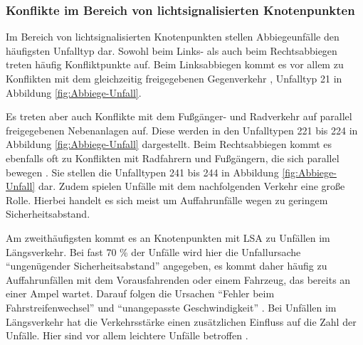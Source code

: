 \subsubsection{Konflikte im Bereich von lichtsignalisierten Knotenpunkten}\label{chapter:Knotenpunkte mit LSA}

Im Bereich von lichtsignalisierten Knotenpunkten stellen Abbiegeunfälle den häufigsten Unfalltyp dar. Sowohl beim Links- als auch beim Rechtsabbiegen treten häufig Konfliktpunkte auf. Beim Linksabbiegen kommt es vor allem zu Konflikten mit dem gleichzeitig freigegebenen Gegenverkehr \parencite[S. 273]{Schreiber.2016}, Unfalltyp 21 in Abbildung \ref{fig:Abbiege-Unfall}.

Es treten aber auch Konflikte mit dem Fußgänger- und Radverkehr auf parallel freigegebenen Nebenanlagen auf. Diese werden in den Unfalltypen 221 bis 224 in Abbildung \ref{fig:Abbiege-Unfall} dargestellt. Beim Rechtsabbiegen kommt es ebenfalls oft zu Konflikten mit Radfahrern und Fußgängern, die sich parallel bewegen \parencite[S. 273]{Schreiber.2016}. Sie stellen die Unfalltypen 241 bis 244 in Abbildung \ref{fig:Abbiege-Unfall} dar. Zudem spielen Unfälle mit dem nachfolgenden Verkehr eine große Rolle. Hierbei handelt es sich meist um Auffahrunfälle wegen zu geringem Sicherheitsabstand.

Am zweithäufigsten kommt es an Knotenpunkten mit \ac{LSA} zu Unfällen im Längsverkehr. Bei fast 70 \% der Unfälle wird hier die Unfallursache \enquote{ungenügender Sicherheitsabstand} angegeben, es kommt daher häufig zu Auffahrunfällen mit dem Vorausfahrenden oder einem Fahrzeug, das bereits an einer Ampel wartet. Darauf folgen die Ursachen \enquote{Fehler beim Fahrstreifenwechsel} und \enquote{unangepasste Geschwindigkeit} \parencite[S. 273]{Schreiber.2016}. Bei Unfällen im Längsverkehr hat die Verkehrsstärke einen zusätzlichen Einfluss auf die Zahl der Unfälle. Hier sind vor allem leichtere Unfälle betroffen \parencite[S. 86]{Aurich.2015}. %

